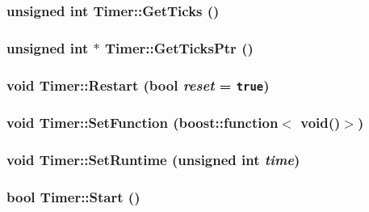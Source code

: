 \hypertarget{class_timer_ae8ab344903fe4e08c16ea5f3bc2c5db}{
\subsubsection[{GetTicks}]{\setlength{\rightskip}{0pt plus 5cm}unsigned int Timer::GetTicks ()}}
\label{class_timer_ae8ab344903fe4e08c16ea5f3bc2c5db}


\hypertarget{class_timer_8ebf68da672a80a4fe91cbf32dbaea94}{
\subsubsection[{GetTicksPtr}]{\setlength{\rightskip}{0pt plus 5cm}unsigned int $\ast$ Timer::GetTicksPtr ()}}
\label{class_timer_8ebf68da672a80a4fe91cbf32dbaea94}


\hypertarget{class_timer_0231c7290412a2e3a582b71e7c17bd97}{
\subsubsection[{Restart}]{\setlength{\rightskip}{0pt plus 5cm}void Timer::Restart (bool {\em reset} = {\tt true})}}
\label{class_timer_0231c7290412a2e3a582b71e7c17bd97}


\hypertarget{class_timer_595dad5b13910a416694a1cdb7806b78}{
\subsubsection[{SetFunction}]{\setlength{\rightskip}{0pt plus 5cm}void Timer::SetFunction (boost::function$<$ void()$>$)}}
\label{class_timer_595dad5b13910a416694a1cdb7806b78}


\hypertarget{class_timer_ce5ec35279c13d6adbf3923e7cc53010}{
\subsubsection[{SetRuntime}]{\setlength{\rightskip}{0pt plus 5cm}void Timer::SetRuntime (unsigned int {\em time})}}
\label{class_timer_ce5ec35279c13d6adbf3923e7cc53010}


\hypertarget{class_timer_394a9f2ca8ebd30053b6078c183c66be}{
\subsubsection[{Start}]{\setlength{\rightskip}{0pt plus 5cm}bool Timer::Start ()}}
\label{class_timer_394a9f2ca8ebd30053b6078c183c66be}


